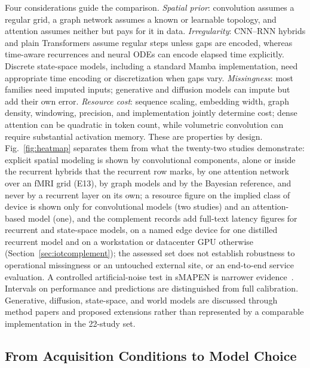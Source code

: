 \documentclass[journal]{IEEEtran}
\begin{document}
Four considerations guide the comparison. \emph{Spatial prior}: convolution assumes a regular grid, a graph network assumes a known or learnable topology, and attention assumes neither but pays for it in data. \emph{Irregularity}: CNN--RNN hybrids and plain Transformers assume regular steps unless gaps are encoded, whereas time-aware recurrences and neural ODEs can encode elapsed time explicitly. Discrete state-space models, including a standard Mamba implementation, need appropriate time encoding or discretization when gaps vary. \emph{Missingness}: most families need imputed inputs; generative and diffusion models can impute but add their own error. \emph{Resource cost}: sequence scaling, embedding width, graph density, windowing, precision, and implementation jointly determine cost; dense attention can be quadratic in token count, while volumetric convolution can require substantial activation memory. These are properties by design. Fig.~\ref{fig:heatmap} separates them from what the twenty-two studies demonstrate: explicit spatial modeling is shown by convolutional components, alone or inside the recurrent hybrids that the recurrent row marks, by one attention network over an fMRI grid (E13), by graph models and by the Bayesian reference, and never by a recurrent layer on its own; a resource figure on the implied class of device is shown only for convolutional models (two studies) and an attention-based model (one), and the complement records add full-text latency figures for recurrent and state-space models, on a named edge device for one distilled recurrent model and on a workstation or datacenter GPU otherwise (Section~\ref{sec:iotcomplement}); the assessed set does not establish robustness to operational missingness or an untouched external site, or an end-to-end service evaluation. A controlled artificial-noise test in sMAPEN is narrower evidence~\cite{lin2024smapen}. Intervals on performance and predictions are distinguished from full calibration. Generative, diffusion, state-space, and world models are discussed through method papers and proposed extensions rather than represented by a comparable implementation in the 22-study set.

\subsection{From Acquisition Conditions to Model Choice}
\label{sec:decision}
\end{document}
